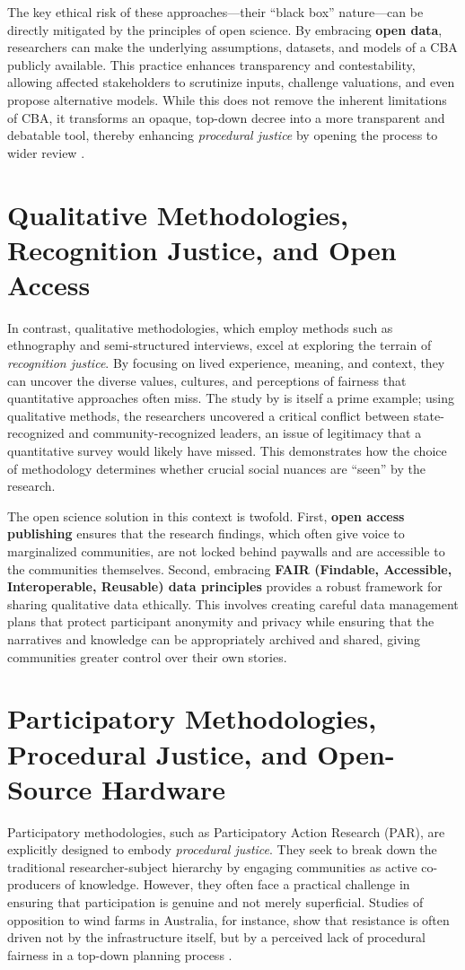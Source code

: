 \documentclass[a4paper, 11pt, twoside]{article}
\begin{document}
The key ethical risk of these approaches—their ``black box'' nature—can be directly mitigated by the principles of open science. By embracing \textbf{open data}, researchers can make the underlying assumptions, datasets, and models of a CBA publicly available. This practice enhances transparency and contestability, allowing affected stakeholders to scrutinize inputs, challenge valuations, and even propose alternative models. While this does not remove the inherent limitations of CBA, it transforms an opaque, top-down decree into a more transparent and debatable tool, thereby enhancing \textit{procedural justice} by opening the process to wider review \parencite{AlonsoPedrero2025}.

\section*{Qualitative Methodologies, Recognition Justice, and Open Access}
In contrast, qualitative methodologies, which employ methods such as ethnography and semi-structured interviews, excel at exploring the terrain of \textit{recognition justice}. By focusing on lived experience, meaning, and context, they can uncover the diverse values, cultures, and perceptions of fairness that quantitative approaches often miss. The study by \textcite{VegaAraujo2022} is itself a prime example; using qualitative methods, the researchers uncovered a critical conflict between state-recognized and community-recognized leaders, an issue of legitimacy that a quantitative survey would likely have missed. This demonstrates how the choice of methodology determines whether crucial social nuances are ``seen'' by the research.

The open science solution in this context is twofold. First, \textbf{open access publishing} ensures that the research findings, which often give voice to marginalized communities, are not locked behind paywalls and are accessible to the communities themselves. Second, embracing \textbf{FAIR (Findable, Accessible, Interoperable, Reusable) data principles} provides a robust framework for sharing qualitative data ethically. This involves creating careful data management plans that protect participant anonymity and privacy while ensuring that the narratives and knowledge can be appropriately archived and shared, giving communities greater control over their own stories.

\section*{Participatory Methodologies, Procedural Justice, and Open-Source Hardware}
Participatory methodologies, such as Participatory Action Research (PAR), are explicitly designed to embody \textit{procedural justice}. They seek to break down the traditional researcher-subject hierarchy by engaging communities as active co-producers of knowledge. However, they often face a practical challenge in ensuring that participation is genuine and not merely superficial. Studies of opposition to wind farms in Australia, for instance, show that resistance is often driven not by the infrastructure itself, but by a perceived lack of procedural fairness in a top-down planning process \parencite{Gross2007}.
\end{document}
